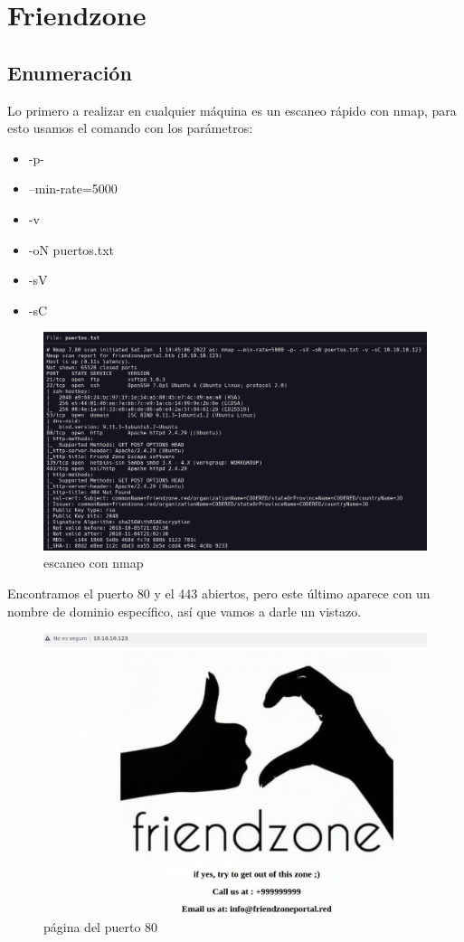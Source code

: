 \documentclass{article}
\begin{document}


\clearpage
\tableofcontents
\clearpage
\section{Friendzone}
\subsection{Enumeración}
Lo primero a realizar en cualquier máquina es un escaneo rápido con nmap, para esto usamos el comando con los parámetros:
\begin{itemize}
	\item -p-
	\item --min-rate=5000
	\item -v
	\item -oN puertos.txt
	\item -sV 
	\item -sC 
\end{itemize}
\begin{figure}[H]
	\center
	\includegraphics[width=\textwidth]{images/friendzone/puertos-nmap.png}
	\caption{escaneo con nmap}
\end{figure}
Encontramos el puerto 80 y el 443 abiertos, pero este último aparece con un nombre de dominio específico, así que vamos a darle un vistazo.
\begin{figure}[H]
	\center
	\includegraphics[width=\textwidth]{images/friendzone/puerto80.png}
	\caption{página del puerto 80}
\end{figure}
\end{document}

